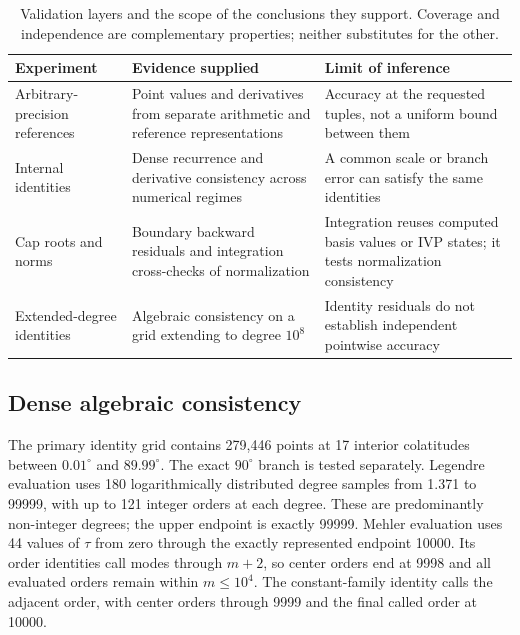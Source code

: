 ﻿\documentclass[11pt,a4paper]{article}
\begin{document}
\begin{table}[htbp]
\centering
\footnotesize
\caption{Validation layers and the scope of the conclusions they support. Coverage and independence are complementary properties; neither substitutes for the other.}
\label{tab:validation_matrix}
\begin{tabularx}{\textwidth}{@{}>{\raggedright\arraybackslash}p{}XX@{}}
\toprule
Experiment & Evidence supplied & Limit of inference\\
\midrule
Arbitrary-precision references & Point values and derivatives from separate arithmetic and reference representations & Accuracy at the requested tuples, not a uniform bound between them\\
Internal identities & Dense recurrence and derivative consistency across numerical regimes & A common scale or branch error can satisfy the same identities\\
Cap roots and norms & Boundary backward residuals and integration cross-checks of normalization & Integration reuses computed basis values or IVP states; it tests normalization consistency\\
Extended-degree identities & Algebraic consistency on a grid extending to degree $10^8$ & Identity residuals do not establish independent pointwise accuracy\\
\bottomrule
\end{tabularx}
\end{table}

\subsection{Dense algebraic consistency}
\label{sec:identity_protocol}

The primary identity grid contains 279,446 points at 17 interior colatitudes between $0.01^\circ$ and $89.99^\circ$. The exact $90^\circ$ branch is tested separately. Legendre evaluation uses 180 logarithmically distributed degree samples from 1.371 to 99999, with up to 121 integer orders at each degree. These are predominantly non-integer degrees; the upper endpoint is exactly 99999. Mehler evaluation uses 44 values of $\tau$ from zero through the exactly represented endpoint 10000. Its order identities call modes through $m+2$, so center orders end at 9998 and all evaluated orders remain within $m\leq10^4$. The constant-family identity calls the adjacent order, with center orders through 9999 and the final called order at 10000.
\end{document}
